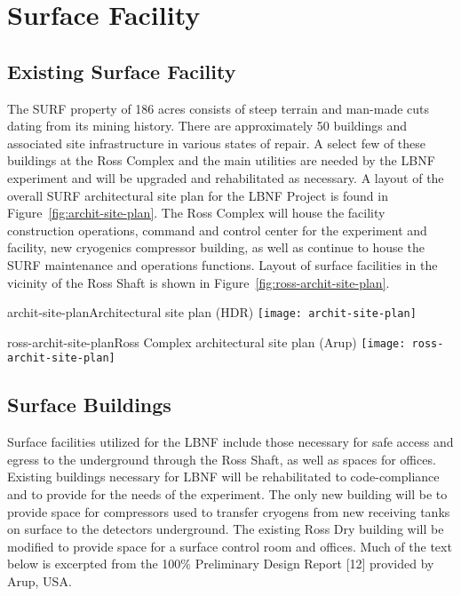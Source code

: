 \chapter{Surface Facility}
\label{ch:fscf-surf-facil}

\section{Existing Surface Facility}
\label{sec:fscf-surf-facil-existing}


The SURF property of 186 acres consists of steep terrain and man-made cuts dating from its mining history. There are approximately 50 buildings and associated site infrastructure in various states of repair. A select few of these buildings at the Ross Complex and the main utilities are needed by the LBNF experiment and will be upgraded and rehabilitated as necessary. A layout of the overall SURF architectural site plan for the LBNF Project is found in Figure~\ref{fig:archit-site-plan}.
The Ross Complex will house the facility construction operations, command and control center for the experiment and facility, new cryogenics compressor building, as well as continue to house the SURF maintenance and operations functions. Layout of surface facilities in the vicinity of the Ross Shaft is shown in Figure~\ref{fig:ross-archit-site-plan}.

\begin{cdrfigure}{archit-site-plan}{Architectural site plan (HDR)}
\texttt{[image: archit-site-plan]}
\end{cdrfigure}

\begin{cdrfigure}{ross-archit-site-plan}{Ross Complex architectural site plan (Arup)}
\texttt{[image: ross-archit-site-plan]}
\end{cdrfigure}

\section{Surface Buildings}
\label{sec:fscf-surf-facil-surface-bldg}

Surface facilities utilized for the LBNF include those necessary for safe access and egress to the underground through the Ross Shaft, as well as spaces for offices. Existing buildings necessary for LBNF will be rehabilitated to code-compliance and to provide for the needs of the experiment. The only new building will be to provide space for compressors used to transfer cryogens from new receiving tanks on surface to the detectors underground. The existing Ross Dry building will be modified to provide space for a surface control room and offices. Much of the text below is excerpted from the 100\% Preliminary Design Report [12] provided by Arup, USA.

